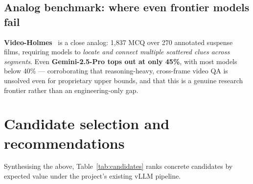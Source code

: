 \documentclass[11pt]{article}
\begin{document}
\subsection{Analog benchmark: where even frontier models fail}
\textbf{Video-Holmes}~\cite{videoholmes} is a close analog: 1{,}837 MCQ over 270
annotated suspense films, requiring models to \emph{locate and connect multiple
scattered clues across segments}. Even \textbf{Gemini-2.5-Pro tops out at only
45\%}, with most models below 40\% --- corroborating that reasoning-heavy,
cross-frame video QA is unsolved even for proprietary upper bounds, and that this
is a genuine research frontier rather than an engineering-only gap.

\section{Candidate selection and recommendations}
Synthesising the above, Table~\ref{tab:candidates} ranks concrete candidates by
expected value under the project's existing vLLM pipeline.
\end{document}
